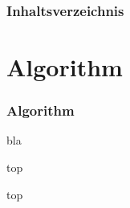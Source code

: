 \documentclass[
    11pt,
    aspectratio=169,
    xcolor={table,dvipsnames}
]{beamer}
\title{\mytitle{}}
\subtitle{\mysubtitle{}}
\author{\myname{}}
\date{\mydate{}}
\numberwithin{equation}{section}
\begin{document}
\frame{\titlepage}

\begin{frame}
    \frametitle{Inhaltsverzeichnis}
    \tableofcontents
\end{frame}

\section{Algorithm}

\begin{frame}
    \frametitle{Algorithm}
    bla
\end{frame}

\begin{frame}
    top
\end{frame}

\begin{frame}[t]
    top
\end{frame}

\end{document}

